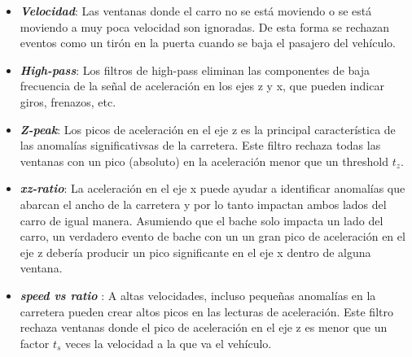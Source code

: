 \begin{itemize}
	\item \emph{\textbf {Velocidad}}: Las ventanas donde el carro no se está moviendo o se está moviendo a muy poca velocidad son ignoradas. 
		De esta forma se rechazan eventos como un tirón en la puerta cuando se baja el pasajero del vehículo.\\
	\item \emph{\textbf {High-pass}}: Los filtros de high-pass eliminan las componentes de baja frecuencia de la señal de aceleración en los ejes z y x, 
		que pueden indicar giros, frenazos, etc.\\
	\item  \emph{\textbf {Z-peak}}: Los picos de aceleración en el eje z es la principal característica de las anomalías significativsas de la carretera.
		Este filtro rechaza todas las ventanas con un pico (absoluto) en la aceleración menor que un threshold $t_z$.\\
	\item  \emph{\textbf {xz-ratio}}: La aceleración en el eje x puede ayudar a identificar anomalías que abarcan el ancho de la carretera y por lo tanto 
		impactan ambos lados del carro de igual manera.  Asumiendo que el bache solo impacta un lado del carro, un verdadero evento de bache con un
		un gran pico de aceleración en el eje z debería producir un pico significante en el eje x dentro de alguna ventana.\\
	\item  \emph{\textbf {speed vs ratio }}:	A altas velocidades, incluso pequeñas anomalías en la carretera pueden crear altos picos en las lecturas 
		de aceleración. Este filtro rechaza ventanas donde el pico de aceleración en el eje z es menor que un factor $t_s$ veces la velocidad a la que 
		va el vehículo.
\end{itemize}

